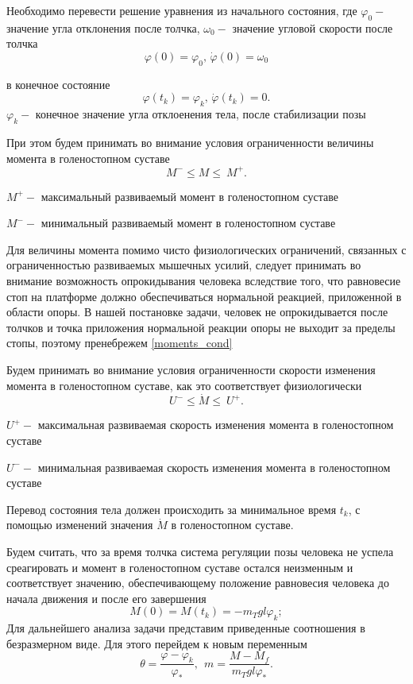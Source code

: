 \documentclass[a4paper,12pt, openany]{book}
\theoremstyle{plain} %
\theoremstyle{definition} %
\theoremstyle{remark} %
\numberwithin{equation}{chapter}
\begin{document}
{Необходимо перевести решение уравнения из начального состояния,
где $\varphi_0-$  значение угла отклонения после толчка,
$\omega_0-$  значение угловой скорости после толчка
\[
    \varphi(0)=\varphi_0, \,\dot{\varphi}(0)=\omega_0
\]

в конечное состояние
\[
    \varphi(t_k)=\varphi_k,\, \dot{\varphi}(t_k)=0.
\]
$\varphi_k - $ конечное значение угла отклоенения тела, после стабилизации позы


При этом будем принимать во внимание
условия ограниченности величины момента в голеностопном суставе
\begin{equation}\label{moments_cond}
    M^-\leqslant M\leqslant\ M^+.
\end{equation}

$M^+ -$ максимальный развиваемый момент в голеностопном суставе

$M^- -$ минимальный развиваемый момент в голеностопном суставе

Для величины момента помимо чисто физиологических ограничений, связанных с ограниченностью развиваемых мышечных усилий, следует принимать во внимание возможность опрокидывания человека вследствие того, что
равновесие стоп на платформе должно обеспечиваться нормальной реакцией, приложенной в области опоры.
В нашей постановке задачи, человек не опрокидывается после толчков и точка приложения нормальной реакции опоры не выходит за пределы стопы, поэтому пренебрежем \eqref{moments_cond}

Будем принимать во внимание условия ограниченности скорости изменения
момента в голеностопном суставе, как это соответствует физиологически
\[
    U^-\leqslant\dot{M}\leqslant\ U^+.
\]

$U^+ -$ максимальная развиваемая скорость изменения момента в голеностопном суставе

$U^- -$ минимальная развиваемая скорость изменения момента в голеностопном суставе

Перевод состояния тела должен происходить за минимальное
время $t_k$, с помощью изменений значения $\dot{M}$ в
голеностопном суставе.

Будем считать, что за время толчка система регуляции позы человека
не успела среагировать и момент в голеностопном суставе остался
неизменным и соответствует значению, обеспечивающему положение
равновесия человека до начала движения и после его завершения
\[
    M(0)=M\left(t_k\right)=-m_Tgl\varphi_k;
\]
Для дальнейшего анализа задачи представим приведенные
соотношения в безразмерном виде. Для этого перейдем
к новым переменным
\[
    \theta=\frac{\varphi-\varphi_k}{\varphi_\ast},\ \ m=\frac{M-M_f}{m_Tgl\varphi_\ast}.
\]

}
\end{document}

